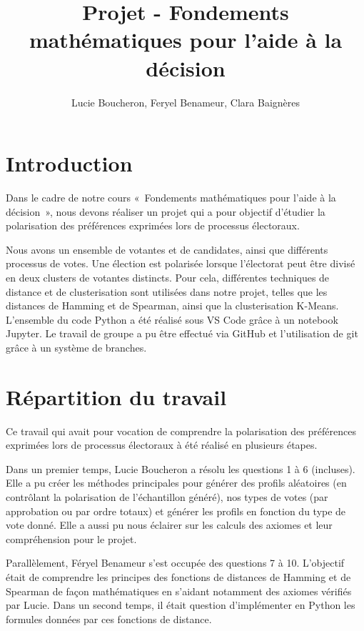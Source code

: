 \documentclass[11pt]{article}
\title{Projet - Fondements mathématiques pour l'aide à la décision}
\author{Lucie Boucheron, Feryel Benameur, Clara Baignères}
\date{}
\begin{document}
\maketitle

\tableofcontents


\section{Introduction}

Dans le cadre de notre cours « Fondements mathématiques pour l’aide à la décision », nous devons réaliser un projet qui a pour objectif d’étudier la polarisation des préférences exprimées lors de processus électoraux. 

Nous avons un ensemble de votantes et de candidates, ainsi que différents processus de votes. Une élection est polarisée lorsque l’électorat peut être divisé en deux clusters de votantes distincts. Pour cela, différentes techniques de distance et de clusterisation sont utilisées dans notre projet, telles que les distances de Hamming et de Spearman, ainsi que la clusterisation K-Means. L’ensemble du code Python a été réalisé sous VS Code grâce à un notebook Jupyter. Le travail de groupe a pu être effectué via GitHub et l’utilisation de git grâce à un système de branches.

\section{Répartition du travail}

Ce travail qui avait pour vocation de comprendre la polarisation des préférences exprimées lors de processus électoraux à été réalisé en plusieurs étapes. 

Dans un premier temps, Lucie Boucheron a résolu les questions 1 à 6 (incluses). Elle a pu créer les méthodes principales pour générer des profils aléatoires (en contrôlant la polarisation de l'échantillon généré), nos types de votes (par approbation ou par ordre totaux) et générer les profils en fonction du type de vote donné. Elle a aussi pu nous éclairer sur les calculs des axiomes et leur compréhension pour le projet.

Parallèlement, Féryel Benameur s’est occupée des questions 7 à 10. L’objectif était de comprendre les principes des fonctions de distances de Hamming et de Spearman de façon mathématiques en s’aidant notamment des axiomes vérifiés par Lucie. Dans un second temps, il était question d’implémenter en Python les formules données par ces fonctions de distance.
\end{document}
